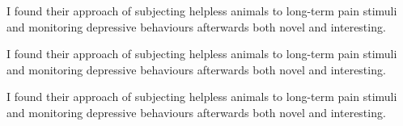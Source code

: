 \documentclass[10pt,letterpaper,twocolumn,landscape]{article}
\begin{document}
\begin{rem}
I found their approach of subjecting helpless animals to long-term pain stimuli and monitoring depressive behaviours afterwards both novel and interesting.
\end{rem}

\begin{rem}
I found their approach of subjecting helpless animals to long-term pain stimuli and monitoring depressive behaviours afterwards both novel and interesting.
\end{rem}

\begin{rem}
I found their approach of subjecting helpless animals to long-term pain stimuli and monitoring depressive behaviours afterwards both novel and interesting.
\end{rem}

\renewcommand{\refname}{Formatted Reference} %
\nocite{*}


\end{document}
